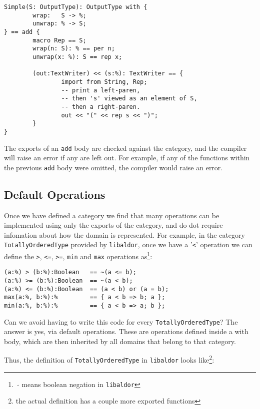 \documentclass{article}
\newcommand{\libaldor}{{\tt libaldor}}
\begin{document}
\begin{small}
\begin{verbatim}
Simple(S: OutputType): OutputType with {
        wrap:   S -> %;
        unwrap: % -> S;
} == add {
        macro Rep == S;
        wrap(n: S): % == per n;
        unwrap(x: %): S == rep x;

        (out:TextWriter) << (s:%): TextWriter == {
                import from String, Rep;
                -- print a left-paren,
                -- then 's' viewed as an element of S,
                -- then a right-paren.
                out << "(" << rep s << ")";
        }
}
\end{verbatim}
\end{small}

The exports of an {\tt add} body are checked against the category, and the
compiler will raise an error if any are left out. For example, if any
of the functions within the previous {\tt add} body were omitted, the
compiler would raise an error.

\subsection{Default Operations}

Once we have defined a category we find that many operations can be
implemented using only the exports of the category, and do dot require
infomation about how the domain is represented.  For example, in the
category {\tt Totally\-Ordered\-Type} provided by \libaldor{}, once we have
a '{\tt <}' operation we can define the
{\tt >}, {\tt <=}, {\tt >=},
{\tt min} and {\tt max} operations as\footnote{~$\tilde{}$ means boolean
negation in \libaldor{}}:

\begin{small}
\begin{verbatim}
(a:%) > (b:%):Boolean   == ~(a <= b);
(a:%) >= (b:%):Boolean  == ~(a < b);
(a:%) <= (b:%):Boolean  == (a < b) or (a = b);
max(a:%, b:%):%         == { a < b => b; a };
min(a:%, b:%):%         == { a < b => a; b };
\end{verbatim}
\end{small}

Can we avoid having to write this code for every
{\tt Totally\-Ordered\-Type}?
The answer is yes, via default operations.  These
are operations defined inside a with body, which are then inherited by
all domains that belong to that category.

Thus, the definition of {\tt Totally\-Ordered\-Type} in \libaldor{} looks
like\footnote{the actual definition has a couple more exported functions}:
\end{document}
